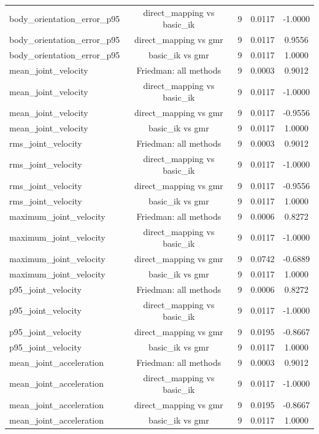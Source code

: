 \begin{table}[t]
{\begin{tabular}{lcccc}
body\_orientation\_error\_p95 & direct\_mapping vs basic\_ik & 9 & 0.0117 & -1.0000 \\
body\_orientation\_error\_p95 & direct\_mapping vs gmr & 9 & 0.0117 & 0.9556 \\
body\_orientation\_error\_p95 & basic\_ik vs gmr & 9 & 0.0117 & 1.0000 \\
mean\_joint\_velocity & Friedman: all methods & 9 & 0.0003 & 0.9012 \\
mean\_joint\_velocity & direct\_mapping vs basic\_ik & 9 & 0.0117 & -1.0000 \\
mean\_joint\_velocity & direct\_mapping vs gmr & 9 & 0.0117 & -0.9556 \\
mean\_joint\_velocity & basic\_ik vs gmr & 9 & 0.0117 & 1.0000 \\
rms\_joint\_velocity & Friedman: all methods & 9 & 0.0003 & 0.9012 \\
rms\_joint\_velocity & direct\_mapping vs basic\_ik & 9 & 0.0117 & -1.0000 \\
rms\_joint\_velocity & direct\_mapping vs gmr & 9 & 0.0117 & -0.9556 \\
rms\_joint\_velocity & basic\_ik vs gmr & 9 & 0.0117 & 1.0000 \\
maximum\_joint\_velocity & Friedman: all methods & 9 & 0.0006 & 0.8272 \\
maximum\_joint\_velocity & direct\_mapping vs basic\_ik & 9 & 0.0117 & -1.0000 \\
maximum\_joint\_velocity & direct\_mapping vs gmr & 9 & 0.0742 & -0.6889 \\
maximum\_joint\_velocity & basic\_ik vs gmr & 9 & 0.0117 & 1.0000 \\
p95\_joint\_velocity & Friedman: all methods & 9 & 0.0006 & 0.8272 \\
p95\_joint\_velocity & direct\_mapping vs basic\_ik & 9 & 0.0117 & -1.0000 \\
p95\_joint\_velocity & direct\_mapping vs gmr & 9 & 0.0195 & -0.8667 \\
p95\_joint\_velocity & basic\_ik vs gmr & 9 & 0.0117 & 1.0000 \\
mean\_joint\_acceleration & Friedman: all methods & 9 & 0.0003 & 0.9012 \\
mean\_joint\_acceleration & direct\_mapping vs basic\_ik & 9 & 0.0117 & -1.0000 \\
mean\_joint\_acceleration & direct\_mapping vs gmr & 9 & 0.0195 & -0.8667 \\
mean\_joint\_acceleration & basic\_ik vs gmr & 9 & 0.0117 & 1.0000 \\

\end{tabular}}
\end{table}
